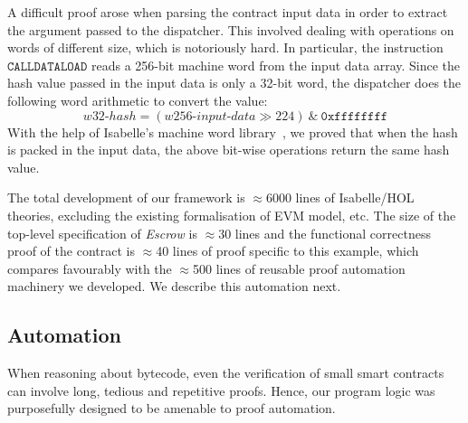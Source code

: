 \documentclass[sigplan,10pt]{acmart}\settopmatter{printfolios=true,printccs=false,printacmref=false}
\newcommand{\instr}[1]{\mathtt{#1}}
\begin{document}
A difficult proof arose when parsing the contract input data
in order to extract the argument passed to the dispatcher.
This involved dealing with operations on words of different size,
which is notoriously hard.
In particular, the instruction $\instr{CALLDATALOAD}$ reads a
256-bit machine word from the input data array.
Since the hash value passed in the input data is only a 32-bit word,
the dispatcher does the following word arithmetic to convert the value:
\[
\mathit{w32}\mbox{-}\mathit{hash} = (\mathit{w256}\mbox{-}\mathit{input}\mbox{-}\mathit{data} \gg 224)\ \text{\&}\ \mathtt{0xffffffff}
\]
With the help of Isabelle's machine word library~\cite{Word_Lib-AFP},
we proved that when the hash is packed in the input data,
the above bit-wise operations return the same hash value.


The total development of our framework is $\approx$6000 lines of Isabelle/HOL theories,
excluding the existing formalisation of EVM model, etc.
The size of the top-level specification of \textit{Escrow} is $\approx$30 lines
and the functional correctness proof of the contract is
$\approx$40 lines of proof specific to this example, which compares
favourably with the $\approx$500 lines of reusable proof
automation machinery we developed.
We describe this automation next.





\subsection{Automation}
\label{sec:auto}

When reasoning about bytecode, even the verification of small smart contracts
can involve long, tedious and repetitive proofs.
Hence, our program logic was purposefully designed to be
amenable to proof automation.
\end{document}
